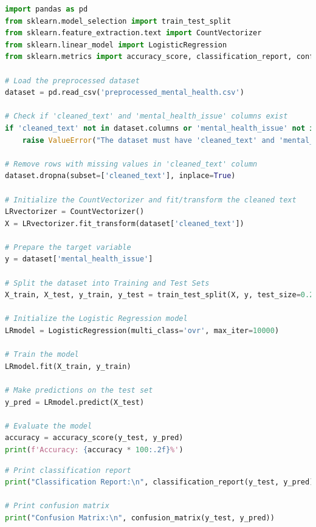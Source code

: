 \begin{tcolorbox}[colback=gray!5!white, colframe=gray!80!black, boxrule=0.5pt, title=Logistic Regression for Mental Health Classification]
    \begin{lstlisting}[language=Python]
import pandas as pd
from sklearn.model_selection import train_test_split
from sklearn.feature_extraction.text import CountVectorizer
from sklearn.linear_model import LogisticRegression
from sklearn.metrics import accuracy_score, classification_report, confusion_matrix

# Load the preprocessed dataset
dataset = pd.read_csv('preprocessed_mental_health.csv')

# Check if 'cleaned_text' and 'mental_health_issue' columns exist
if 'cleaned_text' not in dataset.columns or 'mental_health_issue' not in dataset.columns:
    raise ValueError("The dataset must have 'cleaned_text' and 'mental_health_issue' columns.")

# Remove rows with missing values in 'cleaned_text' column
dataset.dropna(subset=['cleaned_text'], inplace=True)

# Initialize the CountVectorizer and fit/transform the cleaned text
LRvectorizer = CountVectorizer()
X = LRvectorizer.fit_transform(dataset['cleaned_text'])

# Prepare the target variable
y = dataset['mental_health_issue']

# Split the dataset into Training and Test Sets
X_train, X_test, y_train, y_test = train_test_split(X, y, test_size=0.2, random_state=42)

# Initialize the Logistic Regression model
LRmodel = LogisticRegression(multi_class='ovr', max_iter=10000)

# Train the model
LRmodel.fit(X_train, y_train)

# Make predictions on the test set
y_pred = LRmodel.predict(X_test)

# Evaluate the model
accuracy = accuracy_score(y_test, y_pred)
print(f'Accuracy: {accuracy * 100:.2f}%')
\end{lstlisting}
\end{tcolorbox}

\begin{tcolorbox}[colback=gray!5!white, colframe=gray!80!black, boxrule=0.5pt, title=Logistic Regression for Mental Health Classification]
    \begin{lstlisting}[language=Python]
# Print classification report
print("Classification Report:\n", classification_report(y_test, y_pred))

# Print confusion matrix
print("Confusion Matrix:\n", confusion_matrix(y_test, y_pred))
    \end{lstlisting}
\end{tcolorbox}

